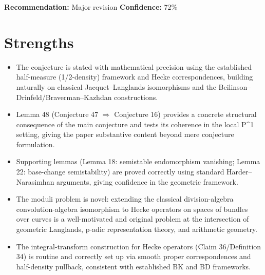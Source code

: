 \documentclass[11pt]{article}
\begin{document}
\textbf{Recommendation:} Major revision \quad \textbf{Confidence:} 72\%\\

\section*{Strengths}
\begin{itemize}[leftmargin=*]
  \item The conjecture is stated with mathematical precision using the established half-measure (1/2-density) framework and Hecke correspondences, building naturally on classical Jacquet--Langlands isomorphisms and the Beilinson--Drinfeld/Braverman--Kazhdan constructions.
  \item Lemma 48 (Conjecture 47 \ensuremath{\Rightarrow} Conjecture 16) provides a concrete structural consequence of the main conjecture and tests its coherence in the local P\^{}1 setting, giving the paper substantive content beyond mere conjecture formulation.
  \item Supporting lemmas (Lemma 18: semistable endomorphism vanishing; Lemma 22: base-change semistability) are proved correctly using standard Harder--Narasimhan arguments, giving confidence in the geometric framework.
  \item The moduli problem is novel: extending the classical division-algebra convolution-algebra isomorphism to Hecke operators on spaces of bundles over curves is a well-motivated and original problem at the intersection of geometric Langlands, p-adic representation theory, and arithmetic geometry.
  \item The integral-transform construction for Hecke operators (Claim 36/Definition 34) is routine and correctly set up via smooth proper correspondences and half-density pullback, consistent with established BK and BD frameworks.
\end{itemize}
\end{document}
